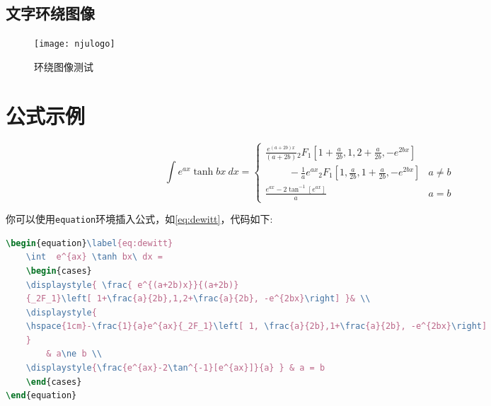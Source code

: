 \documentclass[
    TitleLength=1,%
    Degree=UG,%
    Type=thesis%
]{njuthesis}
\begin{document}
\subsection{文字环绕图像}
\begin{wrapfigure}{r}{0cm}
    \texttt{[image: njulogo]}
    \caption{环绕图像测试}
\end{wrapfigure}
\zhlipsum[3][name=xiangyu]

\section{公式示例}
\begin{equation}\label{eq:dewitt}
    \int  e^{ax} \tanh bx\ dx = 
    \begin{cases}
    \displaystyle{ \frac{ e^{(a+2b)x}}{(a+2b)} 
    {_2F_1}\left[ 1+\frac{a}{2b},1,2+\frac{a}{2b}, -e^{2bx}\right] }& \\
    \displaystyle{
    \hspace{1cm}-\frac{1}{a}e^{ax}{_2F_1}\left[ 1, \frac{a}{2b},1+\frac{a}{2b}, -e^{2bx}\right]
    }
     & a\ne b \\
    \displaystyle{\frac{e^{ax}-2\tan^{-1}[e^{ax}]}{a} } & a = b
    \end{cases}
\end{equation}
    
你可以使用\lstinline|equation|环境插入公式，如\cref{eq:dewitt}，代码如下:
\begin{lstlisting}[language=TeX]
\begin{equation}\label{eq:dewitt}
    \int  e^{ax} \tanh bx\ dx = 
    \begin{cases}
    \displaystyle{ \frac{ e^{(a+2b)x}}{(a+2b)} 
    {_2F_1}\left[ 1+\frac{a}{2b},1,2+\frac{a}{2b}, -e^{2bx}\right] }& \\
    \displaystyle{
    \hspace{1cm}-\frac{1}{a}e^{ax}{_2F_1}\left[ 1, \frac{a}{2b},1+\frac{a}{2b}, -e^{2bx}\right]
    }
        & a\ne b \\
    \displaystyle{\frac{e^{ax}-2\tan^{-1}[e^{ax}]}{a} } & a = b
    \end{cases}
\end{equation}
\end{lstlisting}


\printbibliography[heading=bibintoc, title=参考文献] %

\appendix 
\end{document}
